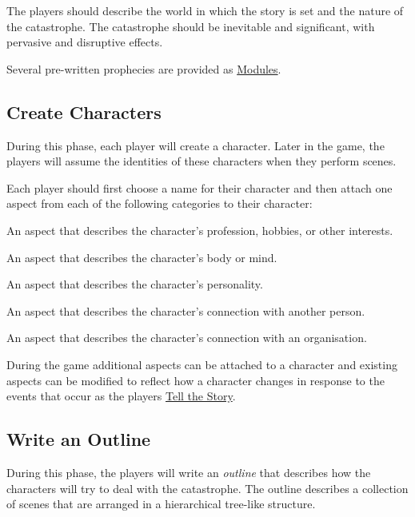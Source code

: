 \documentclass[12pt, a5paper, parskip=half-, footheight=1.4cm]{scrartcl}
\begin{document}
The players should describe the world in which the story is set and the nature of the catastrophe.
The catastrophe should be inevitable and significant, with pervasive and disruptive effects.

Several pre-written  prophecies are provided as \hyperref[section:modules]{\cinzel \small Modules}.

\newpage

\subsection*{Create Characters} \label{subsection:create-characters}
During this phase, each player will create a character.
Later in the game, the players will assume the identities of these characters when they perform scenes.

Each player should first choose a name for their character and then attach one aspect from each of the following categories to their character:
\begin{description}[labelindent=0.25cm, leftmargin=\widthof{\hspace{0.25cm}\textbullet\space}, font=\normalfont\textbullet\bfseries\space]
   \item[Occupation:]
     An aspect that describes the character's profession, hobbies, or other interests.
   \item[Physical Characteristic:]
     An aspect that describes the character's body or mind.
   \item[Psychological Characteristic:]
     An aspect that describes the character's personality.
   \item[Relationship:]
     An aspect that describes the character's connection with another person.
   \item[Affiliation:]
     An aspect that describes the character's connection with an organisation.
\end{description}

\bigskip

During the game additional aspects can be attached to a character and existing aspects can be modified to reflect how a character changes in response to the events that occur as the players \hyperref[subsection:tell-the-story]{\cinzel \small Tell the Story}.

\newpage

\subsection*{Write an Outline} \label{subsection:write-an-outline}
During this phase, the players will write an \emph{outline} that describes how the characters will try to deal with the catastrophe.
The outline describes a collection of scenes that are arranged in a hierarchical tree-like structure.
\end{document}
